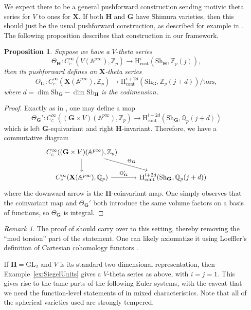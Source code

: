 \documentclass{amsart}
\newtheorem{prop}[theorem]{Proposition}
\theoremstyle{definition}
\theoremstyle{remark}
\newtheorem{remark}[theorem]{Remark}
\newcommand{\1}{\mathbf{1}}
\newcommand{\A}{\mathbb{A}}
\newcommand{\cont}{\mathrm{cont}}
\newcommand{\GL}{\mathrm{GL}}
\newcommand{\h}{\mathrm{H}}
\newcommand{\mb}[1]{\mathbf{#1}}
\newcommand{\Q}{\mathbb{Q}}
\newcommand{\Z}{\mathbb{Z}}
\theoremstyle{definition}
\newcommand{\bG}{\mathbf{G}}
\newcommand{\Sh}{\mathrm{Sh}}
\begin{document}
We expect there to be a general pushforward construction sending motivic theta series for $V$ to ones for $\mb{X}$. If both $\mb{H}$ and $\mb{G}$ have Shimura varieties, then this should just be the usual pushforward construction, as described for example in \cite{LoefflerSpherical}. The following proposition describes that construction in our framework.

\begin{prop}\label{prop:Eisenstein}
    Suppose we have a $V$-theta series
    \[
        \Theta_{\mb{H}}:C_c^\infty(V(\A^{p\infty}),\Z_p)\to\h^i_\cont(\Sh_{\mb{H}},\Z_p(j)),
    \]
    then its pushforward defines an $\mb{X}$-theta series
    \[
        \Theta_{\mb{G}}:C_c^\infty(\mb{X}(\A^{p\infty}),\Z_p)\to\h_\cont^{i+2d}(\Sh_\bG,\Z_p(j+d))/\mathrm{tors},
    \]
    where $d=\dim\Sh_\bG-\dim\Sh_{\mb{H}}$ is the codimension.
\end{prop}
\begin{proof}
    Exactly as in \cite[\S 8.2]{LSZ}, one may define a map
    \[
        \Theta_{\mb{G}}':C_c^\infty((\mb{G}\times V)(\A^{p\infty}),\Z_p)\to\h_\cont^{i+2d}(\Sh_\bG,\Q_p(j+d))
    \]
    which is left $\bG$-equivariant and right $\mb{H}$-invariant. Therefore, we have a commutative diagram
    \[
        \begin{tikzcd}
        C_c^\infty((\bG\times V)(\A^{p\infty}),\Z_p)\dar\drar["{\Theta_{\mb{G}}}"] & \\
        C_c^\infty(\mb{X}(\A^{p\infty}),\Q_p)\rar["{\Theta_{\mb{G}}'}"] & \h_\cont^{i+2d}(\Sh_\bG,\Q_p(j+d))
        \end{tikzcd}
    \]
    where the downward arrow is the $\mb{H}$-coinvariant map. One simply observes that the coinvariant map and $\Theta_{\bG}'$ both introduce the same volume factors on a basis of functions, so $\Theta_{\mb{G}}$ is integral.
\end{proof}
\begin{remark}
    The proof of \cite[Proposition 2.7]{LaiSkinner} should carry over to this setting, thereby removing the ``mod torsion'' part of the statement. One can likely axiomatize it using Loeffler's definition of Cartesian cohomology functors \cite{LoefflerSpherical, GrahamShah}.
\end{remark}

If $\mb{H}=\GL_2$ and $V$ is its standard two-dimensional representation, then Example~\ref{ex:SiegelUnits} gives a $V$-theta series as above, with $i=j=1$. This gives rise to the tame parts of the following Euler systems, with the caveat that we need the function-level statements of \cite{SakWang} in mixed characteristics. Note that all of the spherical varieties used are strongly tempered.
\end{document}

